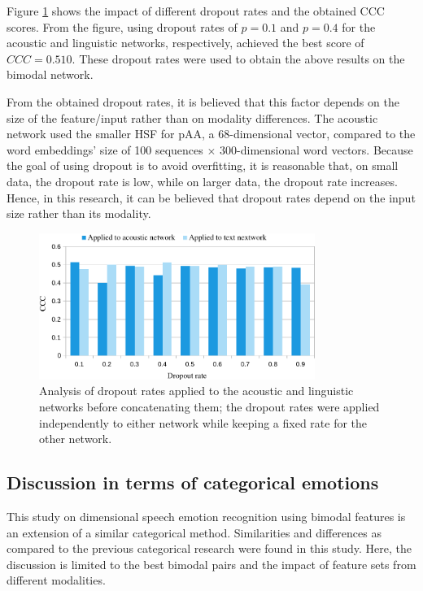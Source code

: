 Figure \ref{fig:dropout} shows the impact of different dropout rates and the
obtained CCC scores. From the figure, using dropout rates of $p=0.1$ and
$p=0.4$ for the acoustic and linguistic networks, respectively, achieved the
best score of $CCC=0.510$. These dropout rates were used to obtain the above
results on the bimodal network. 

From the obtained dropout rates, it is believed that this factor depends on the
size of the feature/input rather than on modality differences. The acoustic
network used the smaller HSF for pAA, a 68-dimensional vector,  compared to the
word embeddings' size of 100 sequences $\times$ 300-dimensional word vectors.
Because the goal of using dropout is to avoid overfitting, it is reasonable
that, on small data, the dropout rate is low, while on larger data, the dropout
rate increases. Hence, in this research, it can be believed that dropout rates
depend on the input size rather than its modality.

\begin{figure}[htpb]
\centering
\includegraphics[width=0.8\textwidth]{../fig/dropout_v2.pdf}
\caption{Analysis of dropout rates applied to the acoustic and linguistic networks before concatenating them; the dropout rates were applied independently to either network while keeping a fixed rate for the other network.} 
\label{fig:dropout}
\end{figure}

\subsection{Discussion in terms of categorical emotions}
This study on dimensional speech emotion recognition using bimodal features is
an extension of a similar categorical method. Similarities and differences as
compared to the previous categorical research were found in this study. Here,
the discussion is limited to the best bimodal pairs and the impact of feature
sets from different modalities.

